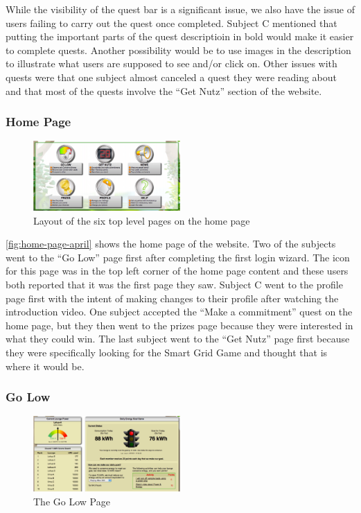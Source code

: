 While the visibility of the quest bar is a significant issue, we also have the issue of users failing to carry out the quest once completed. Subject C mentioned that putting the important parts of the quest descriptioin in bold would make it easier to complete quests. Another possibility would be to use images in the description to illustrate what users are supposed to see and/or click on. Other issues with quests were that one subject almost canceled a quest they were reading about and that most of the quests involve the ``Get Nutz'' section of the website.

\subsubsection{Home Page}

\begin{figure}[t]
    \center
    \includegraphics[width=0.5\textwidth]{images/home-april.eps}
    \caption{Layout of the six top level pages on the home page}
    \label{fig:home-page-april}
\end{figure}

\autoref{fig:home-page-april} shows the home page of the website. Two of the subjects went to the ``Go Low'' page first after completing the first login wizard. The icon for this page was in the top left corner of the home page content and these users both reported that it was the first page they saw. Subject C went to the profile page first with the intent of making changes to their profile after watching the introduction video. One subject accepted the ``Make a commitment'' quest on the home page, but they then went to the prizes page because they were interested in what they could win. The last subject went to the ``Get Nutz'' page first because they were specifically looking for the Smart Grid Game and thought that is where it would be.

\subsubsection{Go Low}

\begin{figure}[t]
    \center
    \includegraphics[width=0.5\textwidth]{images/energy-april.eps}
    \caption{The Go Low Page}
    \label{fig:energy-page-april}
\end{figure}


